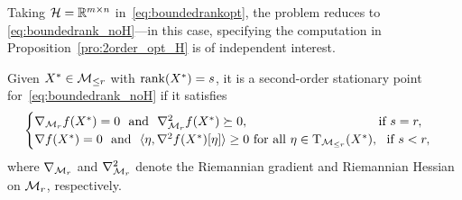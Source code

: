 Taking $\mathcal{H}=\mathbb{R}^{m\times n}$ in~\eqref{eq:boundedrankopt}, the problem reduces to \eqref{eq:boundedrank_noH}---in this case, specifying the computation in Proposition~\ref{pro:2order_opt_H} is of independent interest.
\begin{proposition}\label{pro:sec_opt_Mr}
     Given $X^*\in\mathcal{M}_{\le r}$ with $\operatorname{rank}(X^*)=s$, it is a second-order stationary point for~\eqref{eq:boundedrank_noH} if it satisfies
     \begin{equation}\label{eq:Mr_2order_opt}
         \begin{cases}
            \nabla_{\fixedrank} f(X^*)=0\ \ \text{and}\ \ \nabla^2_{\fixedrank} f(X^*)\succeq 0,\ \ \hspace{3.4cm}\text{if}\ s=r,
    	\\
            \nabla f(X^*)=0\ \ \text{and}\ \ \innerp{\eta,\nabla^2 f(X^*)[\eta]}\ge 0\ \text{for all}\ \eta\in\Btangent_{\boundedrank}(X^*),\ \ \text{if}\ s<r,
            \\
        \end{cases}
     \end{equation}
     where $\nabla_{\mathcal{M}_{r}}$ and $\nabla^2_{\mathcal{M}_{r}}$ denote the Riemannian gradient and Riemannian Hessian on $\mathcal{M}_{r}$, respectively.
\end{proposition}
